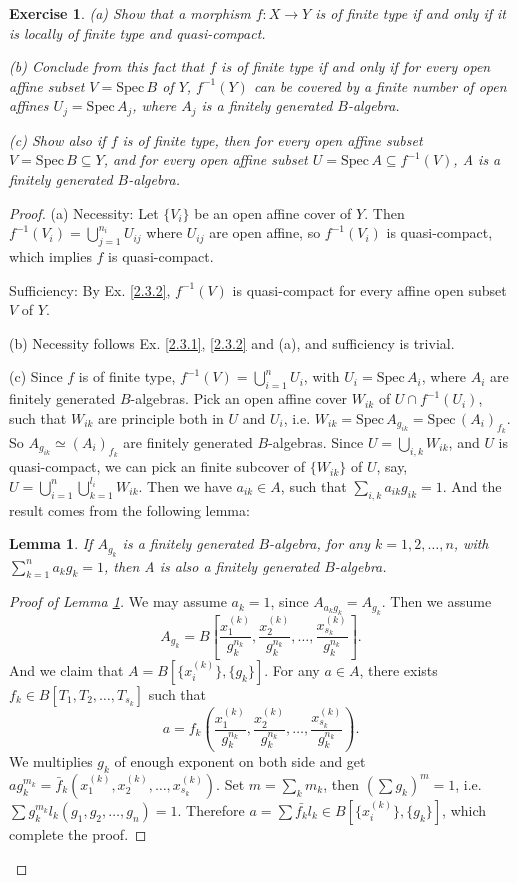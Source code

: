 \documentclass{amsart}
\newtheorem{lm}[theorem]{Lemma}
\newtheorem{exe}{Exercise}[subsection]
\begin{document}
\begin{exe}
(a) Show that a morphism $f:X\rightarrow Y$ is of finite type if and only if it is locally of finite type and quasi-compact.

(b) Conclude from this fact that $f$ is of finite type if and only if for every open affine subset $V=\mathrm{Spec}\,B$ of $Y$, $f^{-1}(Y)$ can be covered
by a finite number of open affines $U_j=\mathrm{Spec}\,A_j$, where $A_j$ is a finitely generated $B$-algebra.

(c) Show also if $f$ is of finite type, then for every open affine subset $V=\mathrm{Spec}\,B\subseteq Y$, and for every open affine
subset $U=\mathrm{Spec}\,A\subseteq f^{-1}(V)$, A is a finitely generated $B$-algebra.
\end{exe}
\begin{proof}
(a) Necessity: Let $\{V_i\}$ be an open affine cover of $Y$. Then $f^{-1}(V_i)=\bigcup_{j=1}^{n_i}U_{ij}$ where $U_{ij}$ are open affine, so $f^{-1}(V_i)$ is quasi-compact, which implies $f$ is quasi-compact.

Sufficiency: By Ex. \ref{2.3.2}, $f^{-1}(V)$ is quasi-compact for every affine open subset $V$ of $Y$.

(b) Necessity follows Ex. \ref{2.3.1}, \ref{2.3.2} and (a), and sufficiency is trivial.

(c) Since $f$ is of finite type, $f^{-1}(V)=\bigcup_{i=1}^nU_i$, with $U_i=\mathrm{Spec}\,A_i$, where $A_i$ are finitely generated $B$-algebras. Pick an open affine cover $W_{ik}$ of $U\cap f^{-1}(U_i)$, such that 
$W_{ik}$ are principle both in $U$ and $U_i$, i.e. $W_{ik}=\mathrm{Spec}\,A_{g_{ik}}=\mathrm{Spec}\,(A_{i})_{f_{k}}$. So $A_{g_{ik}}\simeq (A_{i})_{f_k}$ are finitely generated $B$-algebras. Since $U=\bigcup_{i,k} W_{ik}$, and
$U$ is quasi-compact, we can pick an finite subcover of $\{W_{ik}\}$ of $U$, say, $U=\bigcup_{i=1}^n\bigcup_{k=1}^{l_i}W_{ik}$. Then we have $a_{ik}\in A$, such that $\sum_{i,k} a_{ik}g_{ik}=1$.
And the result comes from the following lemma:
\begin{lm}
	\label{l3}
	If $A_{g_k}$ is a finitely generated $B$-algebra, for any $k=1,2,\dots,n$, with $\sum_{k=1}^n a_kg_k=1$, then A is also a finitely generated $B$-algebra.
\end{lm}
\begin{proof}[Proof of Lemma \ref*{l3}]
	We may assume $a_k=1$, since $A_{a_kg_k}=A_{g_k}$. Then we assume $$A_{g_k}=B\left[\frac{x_1^{(k)}}{g_k^{n_k}},\frac{x_2^{(k)}}{g_k^{n_k}},\dots,\frac{x_{s_k}^{(k)}}{g_k^{n_k}}\right].$$
	And we claim that $A=B[\{x_i^{(k)}\},\{g_k\}]$. For any $a\in A$, there exists $f_k\in B[T_1,T_2,\dots,T_{s_k}]$ such that $$a=f_k\left(\frac{x_1^{(k)}}{g_k^{n_k}},\frac{x_2^{(k)}}{g_k^{n_k}},\dots,\frac{x_{s_k}^{(k)}}{g_k^{n_k}}\right).$$
	We multiplies $g_k$ of enough exponent on both side and get $ag_k^{m_k}=\bar {f}_k(x_1^{(k)},x_2^{(k)},\dots,x_{s_k}^{(k)})$. Set $m=\sum_k m_k$, then $ (\sum g_k)^m=1$, i.e. $\sum g_k^{m_k}l_k(g_1,g_2,\dots,g_n)=1$.
	Therefore $a=\sum \bar{f_k}l_k\in B[\{x_i^{(k)}\},\{g_k\}]$, which complete the proof.
\end{proof}
\end{proof}
\end{document}
